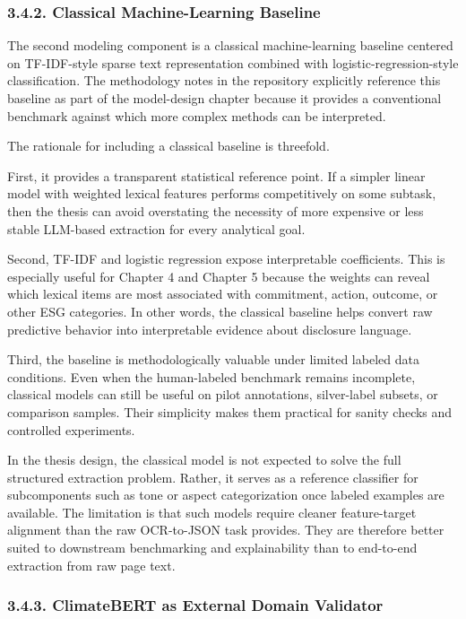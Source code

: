 \documentclass{article}
\begin{document}
\subsubsection*{ 3.4.2. Classical Machine-Learning Baseline}

The second modeling component is a classical machine-learning baseline centered on TF-IDF-style sparse text representation combined with logistic-regression-style classification. The methodology notes in the repository explicitly reference this baseline as part of the model-design chapter because it provides a conventional benchmark against which more complex methods can be interpreted.

The rationale for including a classical baseline is threefold.

First, it provides a transparent statistical reference point. If a simpler linear model with weighted lexical features performs competitively on some subtask, then the thesis can avoid overstating the necessity of more expensive or less stable LLM-based extraction for every analytical goal.

Second, TF-IDF and logistic regression expose interpretable coefficients. This is especially useful for Chapter 4 and Chapter 5 because the weights can reveal which lexical items are most associated with commitment, action, outcome, or other ESG categories. In other words, the classical baseline helps convert raw predictive behavior into interpretable evidence about disclosure language.

Third, the baseline is methodologically valuable under limited labeled data conditions. Even when the human-labeled benchmark remains incomplete, classical models can still be useful on pilot annotations, silver-label subsets, or comparison samples. Their simplicity makes them practical for sanity checks and controlled experiments.

In the thesis design, the classical model is not expected to solve the full structured extraction problem. Rather, it serves as a reference classifier for subcomponents such as tone or aspect categorization once labeled examples are available. The limitation is that such models require cleaner feature-target alignment than the raw OCR-to-JSON task provides. They are therefore better suited to downstream benchmarking and explainability than to end-to-end extraction from raw page text.
\subsubsection*{ 3.4.3. ClimateBERT as External Domain Validator}
\end{document}

